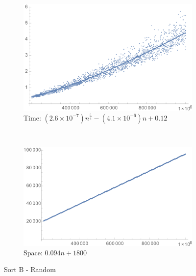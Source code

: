\documentclass[a4paper]{scrartcl}
\begin{document}
\begin{figure}[p]
    \centering
    \begin{subfigure}[b]{0.45\textwidth}
        \includegraphics[width = \textwidth]{sortB_random_time.png}
        \caption{Time: \((2.6 \times 10^{-7}) n^\frac54 - (4.1 \times 10^{-6}) n + 0.12\)}
    \end{subfigure}
    ~
    \begin{subfigure}[b]{0.45\textwidth}
        \includegraphics[width = \textwidth]{sortB_random_space.png}
        \caption{Space: \(0.094 n + 1800\)}
    \end{subfigure}
    \caption{Sort B - Random}
    \label{fig:sortB_random}
\end{figure}
\end{document}
